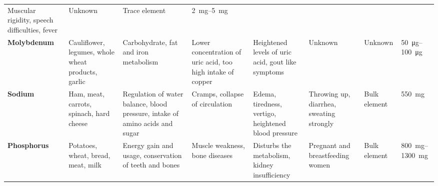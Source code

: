 \documentclass[../main.tex]{subfiles}
\begin{document}
\begin{sidewaystable}[p!]
\begin{small}
\begin{tabularx}{\textwidth}{p{1.2cm}p{2.5cm}p{3cm}p{3cm}p{2.3cm}p{2.5cm}p{3cm}p{1cm}}
    Muscular rigidity, speech difficulties, fever &
    Unknown &
    Trace element &
    \SIrange{2}{5}{\mg} \\
    \textbf{Molyb\-de\-num}\index{mineral!molybdenum} &
    Cauliflower, legumes, whole wheat products, garlic &
    Carbohydrate, fat and iron metabolism &
    Lower concentration of uric acid, too high intake of copper &
    Heightened levels of uric acid, gout like symptoms &
    Unknown &
    Unknown &
    \SIrange{50}{100}{\micro\gram} \\
    \textbf{So\-di\-um}\index{mineral!sodium} &
    Ham, meat, carrots, spinach, hard cheese &
    Regulation of water balance, blood pressure, intake of amino acids and sugar &
    Cramps, collapse of circulation &
    Edema, tiredness, vertigo, heightened blood pressure &
    Throwing up, diarrhea, sweating strongly &
    Bulk element &
    \SI{550}{\mg} \\
    \textbf{Phos\-phor\-us}\index{mineral!phosphorus} &
    Potatoes, wheat, bread, meat, milk &
    Energy gain and usage, conservation of teeth and bones &
    Muscle weakness, bone diseases &
    Disturbs the metabolism, kidney insufficiency &
    Pregnant and breastfeeding women &
    Bulk element &
    \SIrange{800}{1300}{\mg} \\
    \bottomrule
  \end{tabularx}
  \end{small}
  \end{sidewaystable}


\clearpage
\thispagestyle{empty}
\end{document}
